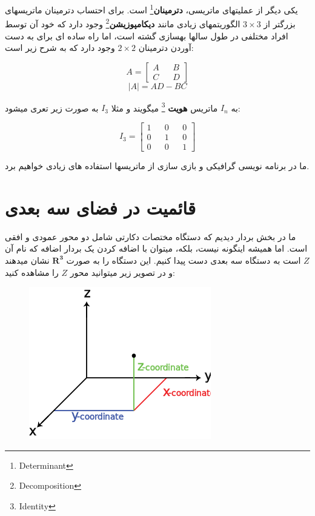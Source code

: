 \documentclass[14pt,a4paper]{memoir}
\begin{document}
	 
	

یکی دیگر از عملیتهای ماتریسی، \textbf{دترمینان}\footnote{Determinant} است. برای احتساب دترمینان ماتریسهای بزرگتر از  $ 3\times3 $ الگوریتمهای زیادی مانند \textbf{دیکامپوزیشن}\footnote{Decomposition} وجود دارد که خود آن توسط افراد مختلفی در طول سالها بهسازی گشته است، اما راه ساده ای برای به دست آوردن دترمینان $ 2\times2 $ وجود دارد که به شرح زیر است:

\[ A = \begin{bmatrix}
A && B\\ 
C && D
\end{bmatrix} \]
\[ |A| = AD - BC \]
	 
	 به $ I_{n} $ ماتریس \textbf{هویت} \footnote{Identity} میگویند و مثلا $ I_3 $ به صورت زیر تعری میشود:
	 
	 \[ I_{3} = \begin{bmatrix}
	 1 && 0 && 0 \\
	 0 && 1 && 0 \\
	 0 && 0 && 1
	 \end{bmatrix} \]
	 
	 ما در برنامه نویسی گرافیکی و بازی سازی از ماتریسها استفاده های زیادی خواهیم برد.
	 
	 \section{قائمیت در فضای سه بعدی}\label{r3}
	 
	 
	 ما در بخش بردار دیدیم که دستگاه مختصات دکارتی شامل دو محور عمودی و افقی است. اما همیشه اینگونه نیست، بلکه، میتوان با اضافه کردن یک بردار اضافه که نام آن $ Z $ است به دستگاه سه بعدی دست پیدا کنیم. این دستگاه را به صورت $ \mathbf{R^3} $ نشان میدهند و در تصویر زیر میتوانید محور $ Z $ را مشاهده کنید:
	  
	 
	\begin{figure}[h]
		\centering
		\includegraphics[scale=1]{R3}
	\end{figure}
	 
\end{document}

